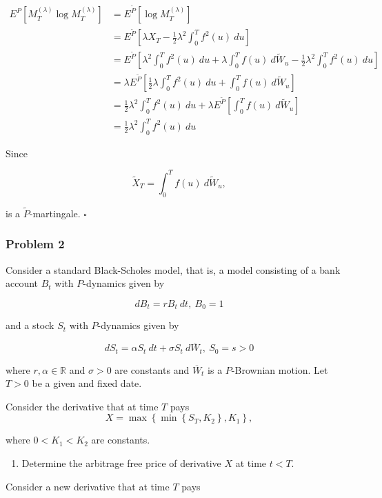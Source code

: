 \documentclass[
]{article}
\providecommand{\tightlist}{%
  \setlength{\itemsep}{0pt}\setlength{\parskip}{0pt}}
\begin{document}
\begin{align*}
E^P[M_T^{(\lambda)}\log M_T^{(\lambda)}]&=E^{\tilde{P}}[\log M_T^{(\lambda)}]\\
&=E^{\tilde{P}}\left[ \lambda X_T-\frac{1}{2}\lambda ^2\int_0^T f^2(u)\ du \right]\\
&=E^{\tilde{P}}\left[ \lambda^2\int_0^Tf^2(u)\ du+\lambda\int_0^Tf(u)\ d\tilde{W}_u-\frac{1}{2}\lambda ^2\int_0^T f^2(u)\ du \right]\\
&=\lambda E^{\tilde{P}}\left[\frac{1}{2} \lambda\int_0^Tf^2(u)\ du+\int_0^Tf(u)\ d\tilde{W}_u \right]\\
&=\frac{1}{2} \lambda^2\int_0^Tf^2(u)\ du+\lambda E^{\tilde{P}}\left[\int_0^Tf(u)\ d\tilde{W}_u \right]\\
&=\frac{1}{2} \lambda^2\int_0^Tf^2(u)\ du
\end{align*}

Since

\[
\tilde{X}_T=\int_0^Tf(u)\ d\tilde{W}_u,
\]

is a \(\tilde{P}\)-martingale. \(\square\)

\hypertarget{problem-2-1}{%
\subsubsection{Problem 2}\label{problem-2-1}}

Consider a standard Black-Scholes model, that is, a model consisting of
a bank account \(B_t\) with \(P\)-dynamics given by

\[
dB_t=rB_t\ dt,\ B_0=1
\]

and a stock \(S_t\) with \(P\)-dynamics given by

\[
dS_t=\alpha S_t\ dt+\sigma S_t\ d\overline{W}_t,\ S_0=s>0
\]

where \(r,\alpha\in\mathbb{R}\) and \(\sigma >0\) are constants and
\(\overline{W}_t\) is a \(P\)-Brownian motion. Let \(T>0\) be a given
and fixed date.

Consider the derivative that at time \(T\) pays \[
X=\max\left\{\min\left\{S_T,K_2\right\},K_1\right\},
\]

where \(0<K_1<K_2\) are constants.

\begin{enumerate}
\def\labelenumi{\alph{enumi}.}
\tightlist
\item
  Determine the arbitrage free price of derivative \(X\) at time
  \(t<T\).
\end{enumerate}

Consider a new derivative that at time \(T\) pays
\end{document}
